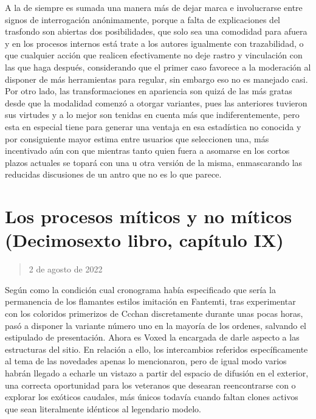 \documentclass[
]{book}
\begin{document}
A la de siempre es sumada una manera más de dejar marca e involucrarse entre signos de interrogación anónimamente, porque a falta de explicaciones del trasfondo son abiertas dos posibilidades, que solo sea una comodidad para afuera y en los procesos internos está trate a los autores igualmente con trazabilidad, o que cualquier acción que realicen efectivamente no deje rastro y vinculación con las que haga después, considerando que el primer caso favorece a la moderación al disponer de más herramientas para regular, sin embargo eso no es manejado casi. Por otro lado, las transformaciones en apariencia son quizá de las más gratas desde que la modalidad comenzó a otorgar variantes, pues las anteriores tuvieron sus virtudes y a lo mejor son tenidas en cuenta más que indiferentemente, pero esta en especial tiene para generar una ventaja en esa estadística no conocida y por consiguiente mayor estima entre usuarios que seleccionen una, más incentivado aún con que mientras tanto quien fuera a asomarse en los cortos plazos actuales se topará con una u otra versión de la misma, enmascarando las reducidas discusiones de un antro que no es lo que parece.

\hypertarget{los-procesos-muxedticos-y-no-muxedticos-decimosexto-libro-capuxedtulo-ix}{%
\section{Los procesos míticos y no míticos (Decimosexto libro, capítulo IX)}\label{los-procesos-muxedticos-y-no-muxedticos-decimosexto-libro-capuxedtulo-ix}}

\begin{quote}
2 de agosto de 2022
\end{quote}

Según como la condición cual cronograma había especificado que sería la permanencia de los flamantes estilos imitación en Fantemti, tras experimentar con los coloridos primerizos de Ccchan discretamente durante unas pocas horas, pasó a disponer la variante número uno en la mayoría de los ordenes, salvando el estipulado de presentación. Ahora es Voxed la encargada de darle aspecto a las estructuras del sitio. En relación a ello, los intercambios referidos específicamente al tema de las novedades apenas lo mencionaron, pero de igual modo varios habrán llegado a echarle un vistazo a partir del espacio de difusión en el exterior, una correcta oportunidad para los veteranos que desearan reencontrarse con o explorar los exóticos caudales, más únicos todavía cuando faltan clones activos que sean literalmente idénticos al legendario modelo.
\end{document}
